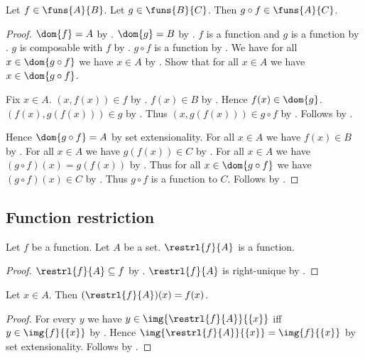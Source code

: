 \begin{proposition}\label{funs_circ}
    Let $f\in\funs{A}{B}$.
    Let $g\in\funs{B}{C}$.
    Then $g\circ f\in\funs{A}{C}$.
\end{proposition}
\begin{proof}
    $\dom{f} = A$ by .
    $\dom{g} = B$ by .
    $f$ is a function and $g$ is a function by .
    $g$ is composable with $f$ by .
    $g\circ f$ is a function by .
    We have for all $x\in\dom{g\circ f}$ we have $x\in A$
        by .
    Show that for all $x\in A$ we have $x\in\dom{g\circ f}$.
    \begin{subproof}
        Fix $x\in A$.
        $(x,f(x))\in f$ by .
        $f(x)\in B$ by .
        Hence $f(x)\in\dom{g}$.
        $(f(x),g(f(x)))\in g$ by .
        Thus $(x,g(f(x)))\in g\circ f$ by .
        Follows by .
    \end{subproof}
    Hence $\dom{g\circ f}=A$ by set extensionality.
    For all $x\in A$ we have $f(x)\in B$ by .
    For all $x\in A$ we have $g(f(x))\in C$ by .
    For all $x\in A$ we have $(g\circ f)(x)=g(f(x))$ by .
    Thus for all $x\in\dom{g\circ f}$ we have $(g\circ f)(x)\in C$
        by \auto.
    Thus $g\circ f$ is a function to $C$.
    Follows by .
\end{proof}

\subsection{Function restriction}

\begin{classification}\label{restrl_of_function_is_function}
    Let $f$ be a function.
    Let $A$ be a set.
    $\restrl{f}{A}$ is a function.
\end{classification}
\begin{proof}
    $\restrl{f}{A}\subseteq f$ by .
    $\restrl{f}{A}$ is right-unique
        by .
\end{proof}

\begin{proposition}\label{restrl_apply}
    Let $x\in A$.
    Then $(\restrl{f}{A})(x)=f(x)$.
\end{proposition}
\begin{proof}
    For every $y$ we have $y\in\img{\restrl{f}{A}}{\{x\}}$
        iff $y\in\img{f}{\{x\}}$ by .
    Hence $\img{\restrl{f}{A}}{\{x\}}=\img{f}{\{x\}}$
        by set extensionality.
    Follows by .
\end{proof}

